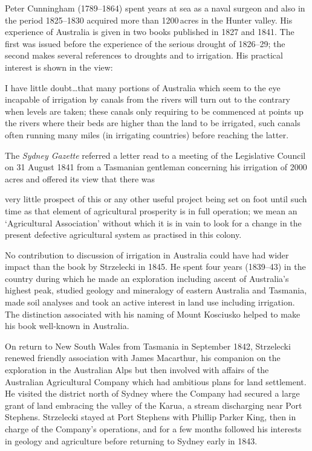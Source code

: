 Peter Cunningham (1789--1864)  spent years at
sea as a naval surgeon and also in the period 1825--1830 acquired more
than 1200\,acres in the Hunter valley.  His experience of Australia is
given in two books published in 1827 and 1841.  The first was issued
before the experience of the serious drought of 1826--29; the second
makes several references to droughts and to irrigation. His practical
interest is shown in the view:
\begin{Quote}
	I have little doubt\ldots that many portions of Australia
	which seem to the eye incapable of irrigation by canals from
	the rivers will turn out to the contrary when levels are
	taken; these canals only requiring to be commenced at points
	up the rivers where their beds are higher than the land to be
	irrigated, such canals often running many miles (in irrigating
	countries) before reaching the
	latter.
\end{Quote}

The \textit{Sydney Gazette} referred a letter read to a meeting of the
Legislative Council on 31 August 1841 from a Tasmanian gentleman
concerning his irrigation of 2000\,acres and offered its view that
there was
\begin{Quote}
	very little prospect of this or any other useful project being
	set on foot until such time as that element of agricultural
	prosperity is in full operation; we mean an `Agricultural
	Association' without which it is in vain to look for a change
	in the present defective agricultural system as practised in
	this colony.
\end{Quote}

No contribution to discussion of irrigation in Australia could have
had wider impact than the book by Strzelecki  in
1845.  He spent four years (1839--43) in the country during which he
made an exploration including ascent of Australia's highest peak,
studied geology and mineralogy of eastern Australia and Tasmania, made
soil analyses and took an active interest in land use including
irrigation.  The distinction associated with his naming of Mount
Kosciusko  helped to make his book well-known
in Australia.

On return to New South Wales from Tasmania in September 1842,
Strzelecki renewed friendly association with James Macarthur,
 his
companion on the exploration in the Australian Alps but then involved
with affairs of the Australian Agricultural Company  which had ambitious plans for land settlement.  He
visited the district north of Sydney where the Company had secured a
large grant of land embracing the valley of the Karua, a stream
discharging near Port Stephens.   Strzelecki
stayed at Port Stephens with Phillip Parker King, 
then in charge of the Company's operations, and for a few months
followed his interests in geology and agriculture before returning to
Sydney early in 1843.

